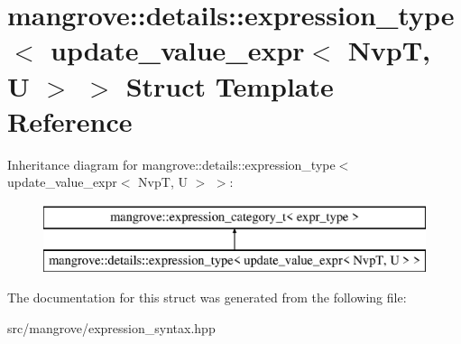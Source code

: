 \hypertarget{structmangrove_1_1details_1_1expression__type_3_01update__value__expr_3_01NvpT_00_01U_01_4_01_4}{}\section{mangrove\+:\+:details\+:\+:expression\+\_\+type$<$ update\+\_\+value\+\_\+expr$<$ NvpT, U $>$ $>$ Struct Template Reference}
\label{structmangrove_1_1details_1_1expression__type_3_01update__value__expr_3_01NvpT_00_01U_01_4_01_4}
Inheritance diagram for mangrove\+:\+:details\+:\+:expression\+\_\+type$<$ update\+\_\+value\+\_\+expr$<$ NvpT, U $>$ $>$\+:\begin{figure}[H]
\begin{center}
\leavevmode
\includegraphics[height=2.000000cm]{structmangrove_1_1details_1_1expression__type_3_01update__value__expr_3_01NvpT_00_01U_01_4_01_4}
\end{center}
\end{figure}


The documentation for this struct was generated from the following file\+:\begin{DoxyCompactItemize}
\item 
src/mangrove/expression\+\_\+syntax.\+hpp\end{DoxyCompactItemize}

